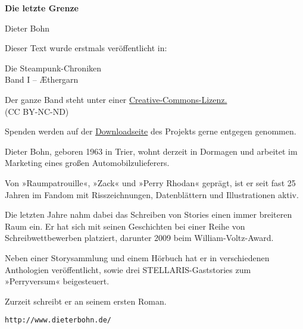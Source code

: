 \usepackage[ngerman]{babel}
\usepackage[T1]{fontenc}



\renewcommand*{\tb}{\begin{center}* \quad * \quad *\end{center}}

\newcommand\bigpar\medskip
\newcommand\gedanke\textit


\raggedbottom
\begin{center}
\textbf{\huge\textsf{Die letzte Grenze}}

\bigskip

Dieter Bohn
\end{center}

\bigskip

\begin{flushleft}
Dieser Text wurde erstmals veröffentlicht in:
\begin{center}
Die Steampunk-Chroniken\\
Band I -- Æthergarn
\end{center}

\bigskip

Der ganze Band steht unter einer
\href{http://creativecommons.org/licenses/by-nc-nd/2.0/de/}{Creative-Commons-Lizenz.} \\
(CC BY-NC-ND)

\bigskip

Spenden werden auf der
\href{http://steampunk-chroniken.de/download}{Downloadseite}
des Projekts gerne entgegen genommen.

\vfill

Dieter Bohn, geboren 1963 in Trier, wohnt derzeit in Dormagen und
arbeitet im Marketing eines großen Automobilzulieferers.

Von »Raumpatrouille«, »Zack« und »Perry Rhodan« geprägt, ist er
seit fast 25 Jahren im Fandom mit Risszeichnungen, Datenblättern
und Illustrationen aktiv.

Die letzten Jahre nahm dabei das Schreiben von Stories einen immer
breiteren Raum ein. Er hat sich mit seinen Geschichten bei einer
Reihe von Schreibwettbewerben platziert, darunter 2009 beim
William-Voltz-Award.

Neben einer Storysammlung und einem Hörbuch hat er in verschiedenen
Anthologien veröffentlicht, sowie drei STELLARIS-Gaststories zum
»Perryversum« beigesteuert.

Zurzeit schreibt er an seinem ersten Roman.

\bigpar

\texttt{http://www.dieterbohn.de/}
\end{flushleft}

